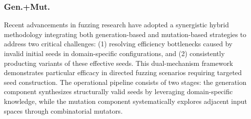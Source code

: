 


    

\subsubsection{Gen.+Mut.}
Recent advancements in fuzzing research have adopted a synergistic hybrid methodology integrating both generation-based and mutation-based strategies to address two critical challenges: (1) resolving efficiency bottlenecks caused by invalid initial seeds in domain-specific configurations, and (2) consistently producting variants of these effective seeds. This dual-mechanism framework demonstrates particular efficacy in directed fuzzing scenarios requiring targeted seed construction. The operational pipeline consists of two stages: the generation component synthesizes structurally valid seeds by leveraging domain-specific knowledge, while the mutation component systematically explores adjacent input spaces through combinatorial mutators.


